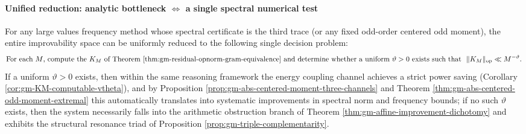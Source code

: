 \paragraph{Unified reduction: analytic bottleneck \texorpdfstring{$\Longleftrightarrow$}{<->} a single spectral numerical test}
\begin{theorem}\label{thm:gm-unified-reduction-one-spectral-number}
For any large values frequency method whose spectral certificate is the third trace (or any fixed odd-order centered odd moment), the entire improvability space can be uniformly reduced to the following single decision problem:
\[
\text{For each \(M\), compute the \(K_M\) of Theorem \ref{thm:gm-residual-opnorm-gram-equivalence} and determine whether a uniform \(\vartheta>0\) exists such that }\ \|K_M\|_{\mathrm{op}}\ll M^{-\vartheta}.
\]
If a uniform \(\vartheta>0\) exists, then within the same reasoning framework the energy coupling channel achieves a strict power saving (Corollary \ref{cor:gm-KM-computable-vtheta}), and by Proposition \ref{prop:gm-abs-centered-moment-three-channels} and Theorem \ref{thm:gm-abs-centered-odd-moment-extremal} this automatically translates into systematic improvements in spectral norm and frequency bounds;
if no such \(\vartheta\) exists, then the system necessarily falls into the arithmetic obstruction branch of Theorem \ref{thm:gm-affine-improvement-dichotomy} and exhibits the structural resonance triad of Proposition \ref{prop:gm-triple-complementarity}.
\end{theorem}

\endinput
